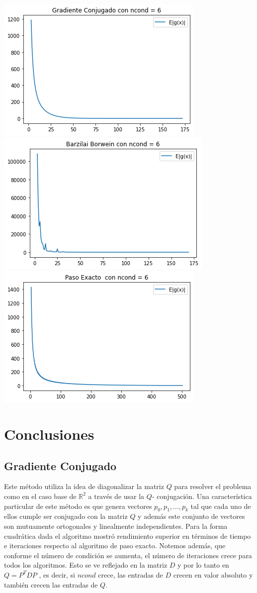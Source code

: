 \documentclass[11pt,letterpaper]{article}
\theoremstyle{definition}
\theoremstyle{definition}
\theoremstyle{definition}
\begin{document}
\begin{center}
	\includegraphics[width=0.7\linewidth]{graficas/gc_6}
	\includegraphics[width=0.7\linewidth]{graficas/bb_6}
	\includegraphics[width=0.7\linewidth]{graficas/sd_6}
\end{center}
\section{Conclusiones}
	\subsection{Gradiente Conjugado}
	Este método utiliza la idea de diagonalizar la matriz $ Q $ para resolver el problema como en el caso base de $ \mathbb{R}^2 $ a través de usar la $ Q $- conjugación. Una característica particular de este método es que genera vectores $ p_0, p_1, \dots, p_k $ tal que cada uno de ellos cumple ser conjugado con la matriz $ Q $ y además este conjunto de vectores son mutuamente ortogonales y linealmente independientes. Para la forma cuadrática dada el algoritmo mostró rendimiento superior en términos de tiempo e iteraciones respecto al algoritmo de paso exacto. Notemos además, que conforme el número de condición se aumenta, el número de iteraciones crece para todos los algoritmos. Esto se ve reflejado en la matriz $ D $ y por lo tanto en $ Q = P^T D P $ , es decir, si $ ncond $ crece, las entradas de $ D $ crecen en valor absoluto y también crecen las entradas de $ Q $. 
\end{document}
